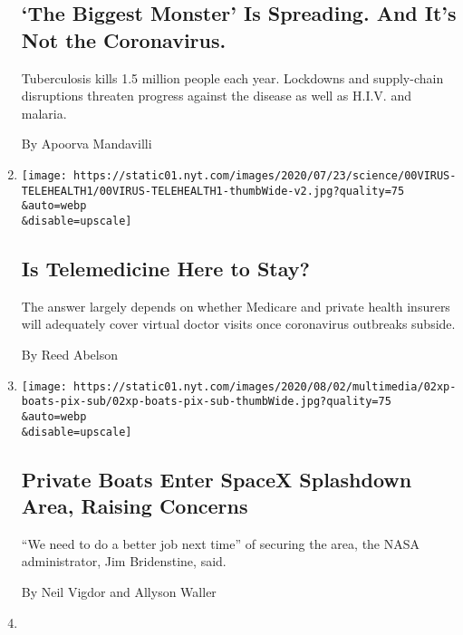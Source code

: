 \begin{enumerate}
  \hypertarget{the-biggest-monster-is-spreading-and-its-not-the-coronavirus}{%
  \subsection{`The Biggest Monster' Is Spreading. And It's Not the
  Coronavirus.}\label{the-biggest-monster-is-spreading-and-its-not-the-coronavirus}}

  Tuberculosis kills 1.5 million people each year. Lockdowns and
  supply-chain disruptions threaten progress against the disease as well
  as H.I.V. and malaria.

  By Apoorva Mandavilli
\item
  \href{/2020/08/03/health/covid-telemedicine-congress.html}{}

  \texttt{[image: https://static01.nyt.com/images/2020/07/23/science/00VIRUS-TELEHEALTH1/00VIRUS-TELEHEALTH1-thumbWide-v2.jpg?quality=75\\\&auto=webp\\\&disable=upscale]}

  \hypertarget{is-telemedicine-here-to-stay}{%
  \subsection{Is Telemedicine Here to
  Stay?}\label{is-telemedicine-here-to-stay}}

  The answer largely depends on whether Medicare and private health
  insurers will adequately cover virtual doctor visits once coronavirus
  outbreaks subside.

  By Reed Abelson
\item
  \href{/2020/08/02/us/flag-boat-SpaceX.html}{}

  \texttt{[image: https://static01.nyt.com/images/2020/08/02/multimedia/02xp-boats-pix-sub/02xp-boats-pix-sub-thumbWide.jpg?quality=75\\\&auto=webp\\\&disable=upscale]}

  \hypertarget{private-boats-enter-spacex-splashdown-area-raising-concerns}{%
  \subsection{Private Boats Enter SpaceX Splashdown Area, Raising
  Concerns}\label{private-boats-enter-spacex-splashdown-area-raising-concerns}}

  ``We need to do a better job next time'' of securing the area, the
  NASA administrator, Jim Bridenstine, said.

  By Neil Vigdor and Allyson Waller
\item
  \href{/2020/08/02/health/dr-birx-coronavirus-phase.html}{}


\end{enumerate}
